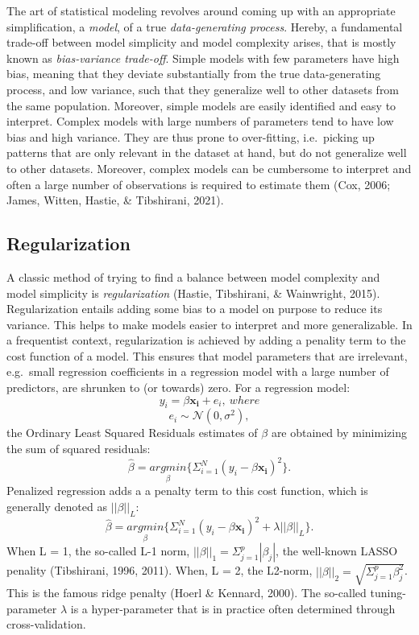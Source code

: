 \documentclass[
  man, donotrepeattitle,floatsintext]{apa6}
\begin{document}
The art of statistical modeling revolves around coming up with an appropriate simplification, a \emph{model}, of a true \emph{data-generating process}. Hereby, a fundamental trade-off between model simplicity and model complexity arises, that is mostly known as \emph{bias-variance trade-off}. Simple models with few parameters have high bias, meaning that they deviate substantially from the true data-generating process, and low variance, such that they generalize well to other datasets from the same population. Moreover, simple models are easily identified and easy to interpret. Complex models with large numbers of parameters tend to have low bias and high variance. They are thus prone to over-fitting, i.e.~picking up patterns that are only relevant in the dataset at hand, but do not generalize well to other datasets. Moreover, complex models can be cumbersome to interpret and often a large number of observations is required to estimate them (Cox, 2006; James, Witten, Hastie, \& Tibshirani, 2021).

\hypertarget{regularization}{%
\subsection{Regularization}\label{regularization}}

A classic method of trying to find a balance between model complexity and model simplicity is \emph{regularization} (Hastie, Tibshirani, \& Wainwright, 2015). Regularization entails adding some bias to a model on purpose to reduce its variance. This helps to make models easier to interpret and more generalizable. In a frequentist context, regularization is achieved by adding a penality term to the cost function of a model. This ensures that model parameters that are irrelevant, e.g.~small regression coefficients in a regression model with a large number of predictors, are shrunken to (or towards) zero. For a regression model:
\[y_i = \beta \mathbf{x_i} + e_i, \ where \]
\[e_i \sim \mathcal{N}(0, \sigma^2), \]
the Ordinary Least Squared Residuals estimates of \(\beta\) are obtained by minimizing the sum of squared residuals:
\[ \hat{\beta} = \underset{\beta}{argmin} \{ \Sigma_{i=1}^N(y_i - \beta\mathbf{x_{i}} )^2 \}.\] Penalized regression adds a a penalty term to this cost function, which is generally denoted as \(||\beta||_L\):
\[ \hat{\beta} = \underset{\beta}{argmin} \{ \Sigma_{i=1}^N(y_i - \beta \mathbf{x_{i}} )^2 + \lambda ||\beta||_{L} \}.\]
When L = 1, the so-called L-1 norm, \(||\beta||_1 = \Sigma_{j=1}^p |\beta_j|\), the well-known LASSO penality (Tibshirani, 1996, 2011). When, L = 2, the L2-norm, \(||\beta||_2 = \sqrt{\Sigma_{j=1}^p \beta_j^2}\). This is the famous ridge penalty (Hoerl \& Kennard, 2000). The so-called tuning-parameter \(\lambda\) is a hyper-parameter that is in practice often determined through cross-validation.
\end{document}

